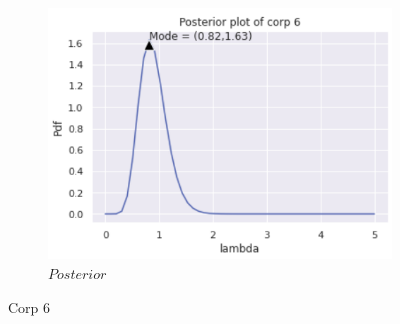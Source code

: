 \documentclass[english,a4paper,12pt]{article}
\begin{document}
\begin{enumerate}
\begin{itemize}
{\begin{figure}[h!]
\begin{subfigure}[b]{0.3\textwidth}
         \includegraphics[width=\textwidth]{pictures/Q3/Posterior_C6.png}
         \caption{$Posterior$}
         \label{Posterior}
     \end{subfigure}
        \caption{Corp 6}
        \label{Corp 4 }
\end{figure}}
 \end{itemize}
 \newpage
 

\end{enumerate}
\end{document}
